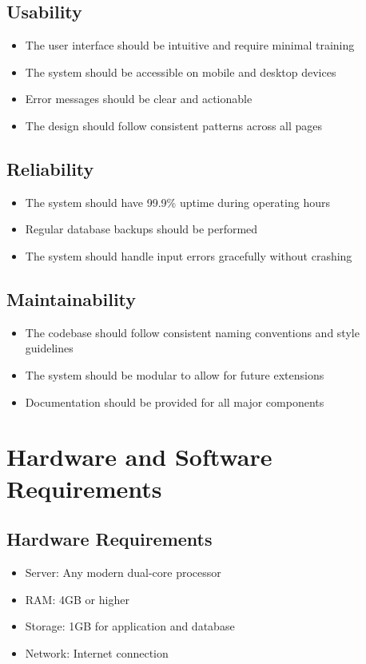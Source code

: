 \documentclass[12pt,a4paper]{report}
\begin{document}
\subsection{Usability}
\begin{itemize}
    \item The user interface should be intuitive and require minimal training
    \item The system should be accessible on mobile and desktop devices
    \item Error messages should be clear and actionable
    \item The design should follow consistent patterns across all pages
\end{itemize}

\subsection{Reliability}
\begin{itemize}
    \item The system should have 99.9\% uptime during operating hours
    \item Regular database backups should be performed
    \item The system should handle input errors gracefully without crashing
\end{itemize}

\subsection{Maintainability}
\begin{itemize}
    \item The codebase should follow consistent naming conventions and style guidelines
    \item The system should be modular to allow for future extensions
    \item Documentation should be provided for all major components
\end{itemize}

\section{Hardware and Software Requirements}

\subsection{Hardware Requirements}
\begin{itemize}
    \item Server: Any modern dual-core processor
    \item RAM: 4GB or higher
    \item Storage: 1GB for application and database
    \item Network: Internet connection
\end{itemize}
\end{document}
